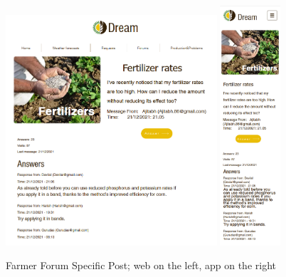 \documentclass{article}
\begin{document}
        \begin{figure} [h]
            \centering
            \includegraphics[width=0.7\textwidth]{images/UserInterfaces/Farmer/Forum/SpecificPostWeb.png}
            \quad
            \includegraphics[width=0.2\textwidth]{images/UserInterfaces/Farmer/Forum/SpecificPostApp.png}
            \quad
            \caption{\label{fig:farmerForumSpecificPost}Farmer Forum Specific Post; web on the left, app on the right}
        \end{figure}
        \newpage
\end{document}
